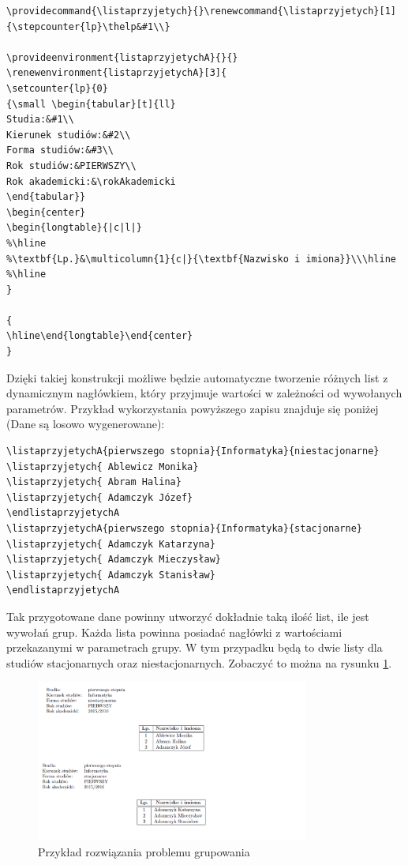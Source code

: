 \begin{lstlisting}
\providecommand{\listaprzyjetych}{}\renewcommand{\listaprzyjetych}[1]{\stepcounter{lp}\thelp&#1\\}

\provideenvironment{listaprzyjetychA}{}{}
\renewenvironment{listaprzyjetychA}[3]{
\setcounter{lp}{0} 
{\small \begin{tabular}[t]{ll}
Studia:&#1\\
Kierunek studiów:&#2\\
Forma studiów:&#3\\
Rok studiów:&PIERWSZY\\
Rok akademicki:&\rokAkademicki
\end{tabular}}
\begin{center}
\begin{longtable}{|c|l|}
%\hline
%\textbf{Lp.}&\multicolumn{1}{c|}{\textbf{Nazwisko i imiona}}\\\hline 
%\hline
}

{
\hline\end{longtable}\end{center}
}
\end{lstlisting}

Dzięki takiej konstrukcji możliwe będzie automatyczne tworzenie różnych list z dynamicznym nagłówkiem, który przyjmuje wartości w zależności od wywołanych parametrów. Przykład wykorzystania powyższego zapisu znajduje się poniżej (Dane są losowo wygenerowane):

\begin{lstlisting}
\listaprzyjetychA{pierwszego stopnia}{Informatyka}{niestacjonarne}
\listaprzyjetych{ Ablewicz Monika}
\listaprzyjetych{ Abram Halina}
\listaprzyjetych{ Adamczyk Józef}
\endlistaprzyjetychA
\listaprzyjetychA{pierwszego stopnia}{Informatyka}{stacjonarne}
\listaprzyjetych{ Adamczyk Katarzyna}
\listaprzyjetych{ Adamczyk Mieczysław}
\listaprzyjetych{ Adamczyk Stanisław}
\endlistaprzyjetychA
\end{lstlisting}

Tak przygotowane dane powinny utworzyć dokładnie taką ilość list, ile jest wywołań grup. Każda lista powinna posiadać nagłówki z wartościami przekazanymi w parametrach grupy. W tym przypadku będą to dwie listy dla studiów stacjonarnych oraz niestacjonarnych. Zobaczyć to można na rysunku \ref{fig:grupowanie}.
\begin{figure}[h]
    \centering
      \includegraphics[width=0.8\textwidth]{rys/szablony/grupowanie.png}
    \caption{Przykład rozwiązania problemu grupowania}
     \label{fig:grupowanie}
\end{figure}
